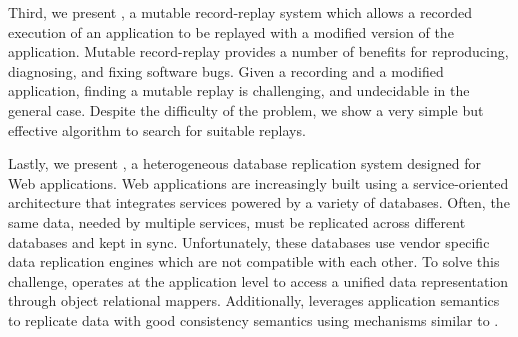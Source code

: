 Third, we present \dora, a mutable record-replay system which allows a recorded
execution of an application to be replayed with a modified version of the
application. Mutable record-replay provides a number of benefits for
reproducing, diagnosing, and fixing software bugs. Given a recording and a
modified application, finding a mutable replay is challenging, and undecidable
in the general case. Despite the difficulty of the problem, we show a very
simple but effective algorithm to search for suitable replays.

Lastly, we present \synapse, a heterogeneous database replication system
designed for Web applications. Web applications are increasingly built using a
service-oriented architecture that integrates services powered by a variety of
databases. Often, the same data, needed by multiple services, must be
replicated across different databases and kept in sync. Unfortunately, these
databases use vendor specific data replication engines which are not compatible with
each other. To solve this challenge, \synapse operates at the application level
to access a unified data representation through object relational mappers.
Additionally, \synapse leverages application semantics to replicate data
with good consistency semantics using mechanisms similar to \scribe.
